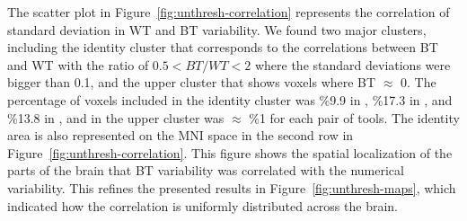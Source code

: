 \documentclass[conference]{IEEEtran}
\begin{document}
The scatter plot in Figure~\ref{fig:unthresh-correlation} represents the correlation of standard deviation in WT and BT variability.
We found two major clusters, including the identity cluster that corresponds to the correlations
between BT and WT with the ratio of $0.5 < BT/WT < 2$ where the standard deviations were bigger than 0.1,
and the upper cluster that shows voxels where BT $\approx$ 0.
The percentage of voxels included in the identity cluster was \%9.9 in \fslspm, \%17.3 in \fslafni, and \%13.8 in \afnispm,
and in the upper cluster was $\approx$ \%1 for each pair of tools.
The identity area is also represented on the MNI space in the second row in Figure~\ref{fig:unthresh-correlation}.
This figure shows the spatial localization of the parts of the brain that BT variability was correlated with the numerical variability.
This refines the presented results in Figure~\ref{fig:unthresh-maps},
which indicated how the correlation is uniformly distributed across the brain.

  \begin{figure}[ht]
  \end{figure}
\end{document}
